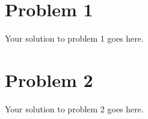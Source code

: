 \documentclass{6046}
\author{Ben Bitdiddle}
\begin{document}
\section*{Problem 1}
Your solution to problem 1 goes here. 


\section*{Problem 2}
Your solution to problem 2 goes here.
\end{document}
